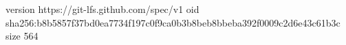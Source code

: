 version https://git-lfs.github.com/spec/v1
oid sha256:b8b5857f37bd0ea7734f197c0f9ca0b3b8beb8bbeba392f0009c2d6e43c61b3c
size 564

